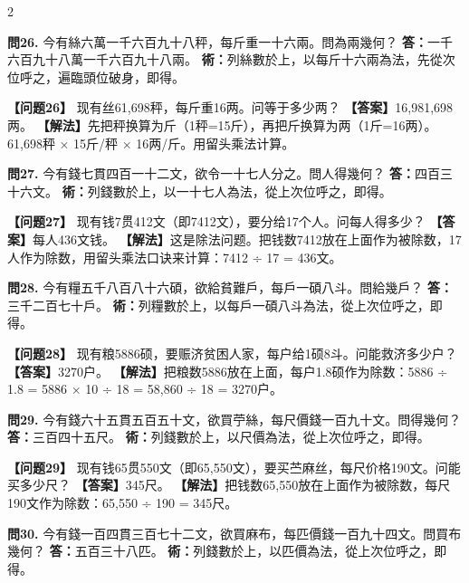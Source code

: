 \documentclass[11pt,a4paper]{article}
\begin{document}
\begin{paracol}{2}
\switchcolumn*

\textbf{問26.} 今有絲六萬一千六百九十八秤，每斤重一十六兩。問為兩幾何？\break
\textbf{答：}一千六百九十八萬一千六百九十八兩。\break
\textbf{術：}列絲數於上，以每斤十六兩為法，先從次位呼之，遍臨頭位破身，即得。

\switchcolumn

\textbf{【问题26】} 现有丝61,698秤，每斤重16两。问等于多少两？\break
\textbf{【答案】}16,981,698两。\break
\textbf{【解法】}先把秤换算为斤（1秤=15斤），再把斤换算为两（1斤=16两）。61,698秤 × 15斤/秤 × 16两/斤。用留头乘法计算。

\switchcolumn*

\textbf{問27.} 今有錢七貫四百一十二文，欲令一十七人分之。問人得幾何？\break
\textbf{答：}四百三十六文。\break
\textbf{術：}列錢數於上，以一十七人為法，從上次位呼之，即得。

\switchcolumn

\textbf{【问题27】} 现有钱7贯412文（即7412文），要分给17个人。问每人得多少？\break
\textbf{【答案】}每人436文钱。\break
\textbf{【解法】}这是除法问题。把钱数7412放在上面作为被除数，17人作为除数，用留头乘法口诀来计算：7412 ÷ 17 = 436文。

\switchcolumn*

\textbf{問28.} 今有糧五千八百八十六碩，欲給貧難戶，每戶一碩八斗。問給幾戶？\break
\textbf{答：}三千二百七十戶。\break
\textbf{術：}列糧數於上，以每戶一碩八斗為法，從上次位呼之，即得。

\switchcolumn

\textbf{【问题28】} 现有粮5886硕，要赈济贫困人家，每户给1硕8斗。问能救济多少户？\break
\textbf{【答案】}3270户。\break
\textbf{【解法】}把粮数5886放在上面，每户1.8硕作为除数：5886 ÷ 1.8 = 5886 × 10 ÷ 18 = 58,860 ÷ 18 = 3270户。

\switchcolumn*

\textbf{問29.} 今有錢六十五貫五百五十文，欲買苧絲，每尺價錢一百九十文。問得幾何？\break
\textbf{答：}三百四十五尺。\break
\textbf{術：}列錢數於上，以尺價為法，從上次位呼之，即得。

\switchcolumn

\textbf{【问题29】} 现有钱65贯550文（即65,550文），要买苎麻丝，每尺价格190文。问能买多少尺？\break
\textbf{【答案】}345尺。\break
\textbf{【解法】}把钱数65,550放在上面作为被除数，每尺190文作为除数：65,550 ÷ 190 = 345尺。

\switchcolumn*

\textbf{問30.} 今有錢一百四貫三百七十二文，欲買麻布，每匹價錢一百九十四文。問買布幾何？\break
\textbf{答：}五百三十八匹。\break
\textbf{術：}列錢數於上，以匹價為法，從上次位呼之，即得。


\end{paracol}
\end{document}
